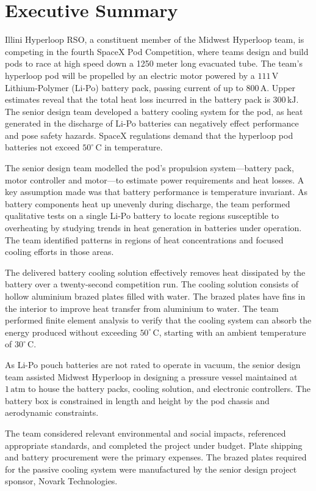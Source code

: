 \documentclass[11pt]{article}
\numberwithin{equation}{subsection} %
\newcommand{\unit}[1]{\ensuremath{\, \mathrm{#1}}}             %
\newcommand{\degree}{^\circ}                                   %
\begin{document}
\section{Executive Summary}
Illini Hyperloop RSO, a constituent member of the Midwest Hyperloop team, is competing in the fourth SpaceX Pod Competition, where teams design and build pods to race at high speed down a 1250 meter long evacuated tube. The team's hyperloop pod will be propelled by an electric motor powered by a $111\unit{V}$ Lithium-Polymer (Li-Po) battery pack, passing current of up to $800\unit{A}.$ Upper estimates reveal that the total heat loss incurred in the battery pack is $300\unit{kJ}.$ The senior design team developed a battery cooling system for the pod, as heat generated in the discharge of Li-Po batteries can negatively effect performance and pose safety hazards. SpaceX regulations demand that the hyperloop pod batteries not exceed $50\degree\unit{C}$ in temperature.

The senior design team modelled the pod's propulsion system---battery pack, motor controller and motor---to estimate power requirements and heat losses. A key assumption made was that battery performance is temperature invariant. As battery components heat up unevenly during discharge, the team performed qualitative tests on a single Li-Po battery to locate regions susceptible to overheating by studying trends in heat generation in batteries under operation. The team identified patterns in regions of heat concentrations and focused cooling efforts in those areas.

The delivered battery cooling solution effectively removes heat dissipated by the battery over a twenty-second competition run. The cooling solution consists of hollow aluminium brazed plates filled with water. The brazed plates have fins in the interior to improve heat transfer from aluminium to water. The team performed finite element analysis to verify that the cooling system can absorb the energy produced without exceeding $50\degree\unit{C}$, starting with an ambient temperature of $30\degree\unit{C}.$

As Li-Po pouch batteries are not rated to operate in vacuum, the senior design team assisted Midwest Hyperloop in designing a pressure vessel maintained at $1\unit{atm}$ to house the battery packs, cooling solution, and electronic controllers. The battery box is constrained in length and height by the pod chassis and aerodynamic constraints.

The team considered relevant environmental and social impacts, referenced appropriate standards, and completed the project under budget. Plate shipping and battery procurement were the primary expenses. The brazed plates required for the passive cooling system were manufactured by the senior design project sponsor, Novark Technologies.
\end{document}
